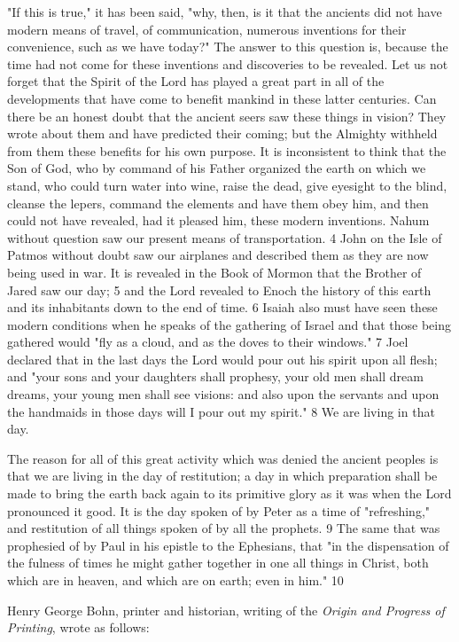 "If this is true," it has been said, "why, then, is it that the ancients did not have modern means
of travel, of communication, numerous inventions for their convenience, such as we have
today?" The answer to this question is, because the time had not come for these inventions
and discoveries to be revealed. Let us not forget that the Spirit of the Lord has played a great
part in all of the developments that have come to benefit mankind in these latter centuries.
Can there be an honest doubt that the ancient seers saw these things in vision? They wrote
about them and have predicted their coming; but the Almighty withheld from them these
benefits for his own purpose. It is inconsistent to think that the Son of God, who by
command of his Father organized the earth on which we stand, who could turn water into
wine, raise the dead, give eyesight to the blind, cleanse the lepers, command the elements
and have them obey him, and then could not have revealed, had it pleased him, these modern
inventions. Nahum without question saw our present means of transportation. 4 John on the
Isle of Patmos without doubt saw our airplanes and described them as they are now being
used in war. It is revealed in the Book of Mormon that the Brother of Jared saw our day; 5
and the Lord revealed to Enoch the history of this earth and its inhabitants down to the end of
time. 6 Isaiah also must have seen these modern conditions when he speaks of the gathering
of Israel and that those being gathered would "fly as a cloud, and as the doves to their
windows." 7 Joel declared that in the last days the Lord would pour out his spirit upon all
flesh; and "your sons and your daughters shall prophesy, your old men shall dream dreams,
your young men shall see visions: and also upon the servants and upon the handmaids in
those days will I pour out my spirit." 8 We are living in that day.

The reason for all of this great activity which was denied the ancient peoples is that we are
living in the day of restitution; a day in which preparation shall be made to bring the earth
back again to its primitive glory as it was when the Lord pronounced it good. It is the day
spoken of by Peter as a time of "refreshing," and restitution of all things spoken of by all the
prophets. 9 The same that was prophesied of by Paul in his epistle to the Ephesians, that "in
the dispensation of the fulness of times he might gather together in one all things in Christ,
both which are in heaven, and which are on earth; even in him." 10

Henry George Bohn, printer and historian, writing of the \textit{Origin and Progress of Printing},
wrote as follows:

